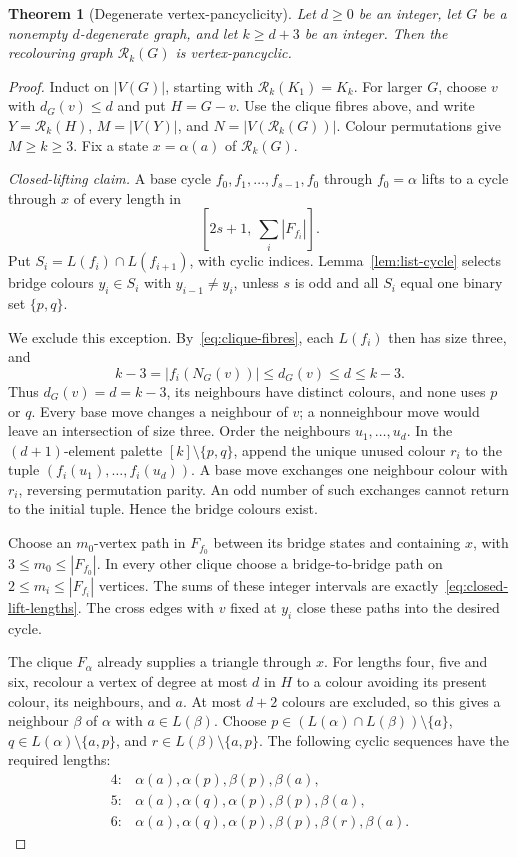 \documentclass[11pt]{article}
\newtheorem{theorem}{Theorem}[section]
\theoremstyle{remark}
\newcommand{\Rk}{\mathcal R_k}
\numberwithin{equation}{section}
\numberwithin{table}{section}
\begin{document}
\begin{theorem}[Degenerate vertex-pancyclicity]\label{thm:degenerate-vp}
Let $d\ge0$ be an integer, let $G$ be a nonempty $d$-degenerate graph,
and let $k\ge d+3$ be an integer.
Then the recolouring graph $\Rk(G)$ is vertex-pancyclic.

\end{theorem}

\begin{proof}
Induct on $|V(G)|$, starting with $\Rk(K_1)=K_k$. For larger $G$,
choose $v$ with $d_G(v)\le d$ and put $H=G-v$.
Use the clique fibres above, and write
$Y=\Rk(H)$, $M=|V(Y)|$, and $N=|V(\Rk(G))|$.
Colour permutations give $M\ge k\ge3$.
Fix a state $x=\alpha(a)$ of $\Rk(G)$.

\emph{Closed-lifting claim.} A base cycle
$f_0,f_1,\ldots,f_{s-1},f_0$ through $f_0=\alpha$ lifts to a cycle
through $x$ of every length in
\begin{equation}\label{eq:closed-lift-lengths}
 [2s+1,\ \textstyle\sum_i|F_{f_i}|].
\end{equation}
Put $S_i=L(f_i)\cap L(f_{i+1})$, with cyclic indices.
Lemma~\ref{lem:list-cycle} selects bridge colours $y_i\in S_i$
with $y_{i-1}\ne y_i$, unless $s$ is odd and all $S_i$ equal
one binary set $\{p,q\}$.

We exclude this exception. By~\eqref{eq:clique-fibres}, each
$L(f_i)$ then has size three, and
\[
 k-3=|f_i(N_G(v))|\le d_G(v)\le d\le k-3.
\]
Thus $d_G(v)=d=k-3$, its neighbours have distinct colours, and
none uses $p$ or $q$. Every base move changes a neighbour of $v$;
a nonneighbour move would leave an intersection of size three.
Order the neighbours $u_1,\ldots,u_d$. In the $(d+1)$-element
palette $[k]\setminus\{p,q\}$, append the unique unused colour
$r_i$ to the tuple $(f_i(u_1),\ldots,f_i(u_d))$.
A base move exchanges one neighbour colour with $r_i$, reversing
permutation parity. An odd number of such exchanges cannot return
to the initial tuple. Hence the bridge colours exist.

Choose an $m_0$-vertex path in $F_{f_0}$ between its bridge states
and containing $x$, with $3\le m_0\le|F_{f_0}|$.
In every other clique choose a bridge-to-bridge path on
$2\le m_i\le|F_{f_i}|$ vertices. The sums of these integer intervals
are exactly~\eqref{eq:closed-lift-lengths}. The cross edges with $v$
fixed at $y_i$ close these paths into the desired cycle.

The clique $F_\alpha$ already supplies a triangle through $x$.
For lengths four, five and six, recolour a vertex of degree at most
$d$ in $H$ to a colour avoiding its present colour, its neighbours,
and $a$. At most $d+2$ colours are excluded, so this gives a neighbour
$\beta$ of $\alpha$ with $a\in L(\beta)$.
Choose $p\in(L(\alpha)\cap L(\beta))\setminus\{a\}$,
$q\in L(\alpha)\setminus\{a,p\}$, and
$r\in L(\beta)\setminus\{a,p\}$.
The following cyclic sequences have the required lengths:
\[
\begin{array}{ll}
4:&\alpha(a),\alpha(p),\beta(p),\beta(a),\\
5:&\alpha(a),\alpha(q),\alpha(p),\beta(p),\beta(a),\\
6:&\alpha(a),\alpha(q),\alpha(p),\beta(p),\beta(r),\beta(a).
\end{array}
\]


\end{proof}
\end{document}
